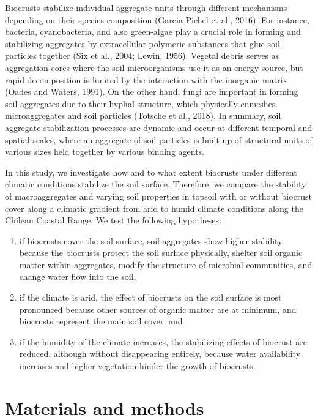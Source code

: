 Biocrusts stabilize individual aggregate units through different mechanisms depending on their species composition (Garcia-Pichel et al., 2016). For instance, bacteria, cyanobacteria, and also green-algae play a crucial role in forming and stabilizing aggregates by extracellular polymeric substances that glue soil particles together  (Six et al., 2004; Lewin, 1956). Vegetal debris serves as aggregation cores where the soil microorganisms use it as an energy source, but rapid decomposition is limited by the interaction with the inorganic matrix (Oades and Waters, 1991). On the other hand, fungi are important in forming soil aggregates due to their hyphal structure, which physically enmeshes microaggregates and soil particles (Totsche et al., 2018). In summary, soil aggregate stabilization processes are dynamic and occur at different temporal and spatial scales, where an aggregate of soil particles is built up of structural units of various sizes held together by various binding agents.

In this study, we investigate how and to what extent biocrusts under different climatic conditions stabilize the soil surface. Therefore, we compare the stability of macroaggregates and varying soil properties in topsoil with or without biocrust cover along a climatic gradient from arid to humid climate conditions along the Chilean Coastal Range. We test the following hypotheses:

\begin{enumerate}[label=(\roman*)] %
    \item if biocrusts cover the soil surface, soil aggregates show higher stability because the biocrusts protect the soil surface physically, shelter soil organic matter within aggregates, modify the structure of microbial communities, and change water flow into the soil,

    \item if the climate is arid, the effect of biocrusts on the soil surface is most pronounced because other sources of organic matter are at minimum, and biocrusts represent the main soil cover, and

    \item if the humidity of the climate increases, the stabilizing effects of biocrust are reduced, although without disappearing entirely, because water availability increases and higher vegetation hinder the growth of biocrusts.
\end{enumerate}

\section{Materials and methods}
